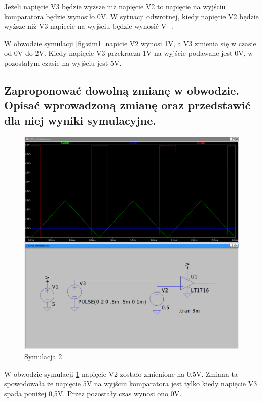 \documentclass[a4paper, 11pt]{article}
\begin{document}
Jeżeli napięcie V3 będzie wyższe niż napięcie V2 to napięcie na wyjściu komparatora będzie wynosiło 0V. W sytuacji odwrotnej, kiedy napięcie V2 będzie wyższe niż V3 napięcie na wyjściu będzie wynosić V+.


W obwodzie symulacji \ref{fig:sim1} napicie V2 wynosi 1V, a V3 zmienia się w czasie od 0V do 2V. Kiedy napięcie V3 przekracza 1V na wyjście podawane jest 0V, w pozostałym czasie na wyjściu jest 5V.


\pagebreak

\subsection{Zaproponować dowolną zmianę w obwodzie. Opisać wprowadzoną zmianę oraz przedstawić dla
	niej wyniki symulacyjne.}\label{sub:2.2} %

\begin{figure}[h]
	\centering
	\includegraphics[scale = 0.25]{images/22_simulation.png}
	\caption{Symulacja 2}
	\label{fig:sim2}
\end{figure}

W obwodzie symulacji \ref{fig:sim2} napięcie V2 zostało zmienione na 0,5V. Zmiana ta spowodowała że napięcie 5V na wyjściu komparatora jest tylko kiedy napięcie V3 spada poniżej 0,5V. Przez pozostały czas wynosi ono 0V.

\end{document}
